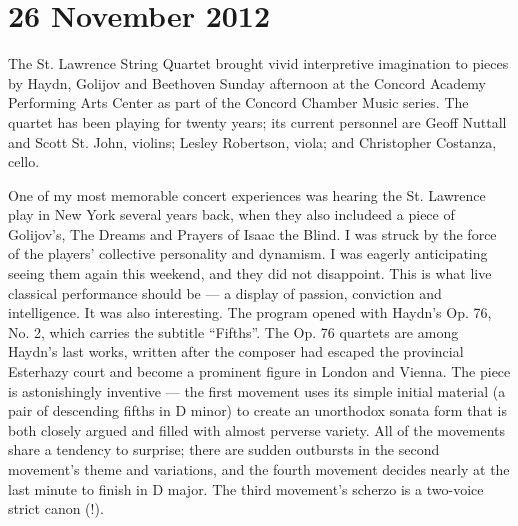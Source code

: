 
\chapter{26 November 2012}

The St. Lawrence String Quartet brought vivid interpretive imagination to pieces by Haydn, Golijov and Beethoven Sunday afternoon at the Concord Academy Performing Arts Center as part of the Concord Chamber Music series. The quartet has been playing for twenty years; its current personnel are Geoff Nuttall and Scott St. John, violins; Lesley Robertson, viola; and Christopher Costanza, cello.

One of my most memorable concert experiences was hearing the St. Lawrence play in New York several years back, when they also includeed a piece of Golijov’s, The Dreams and Prayers of Isaac the Blind. I was struck by the force of the players’ collective personality and dynamism. I was eagerly anticipating seeing them again this weekend, and they did not disappoint. This is what live classical performance should be — a display of passion, conviction and intelligence. It was also interesting. The program opened with Haydn’s Op. 76, No. 2, which carries the subtitle “Fifths”. The Op. 76 quartets are among Haydn’s last works, written after the composer had escaped the provincial Esterhazy court and become a prominent figure in London and Vienna. The piece is astonishingly inventive — the first movement uses its simple initial material (a pair of descending fifths in D minor) to create an unorthodox sonata form that is both closely argued and filled with almost perverse variety. All of the movements share a tendency to surprise; there are sudden outbursts in the second movement’s theme and variations, and the fourth movement decides nearly at the last minute to finish in D major. The third movement’s scherzo is a two-voice strict canon (!).

